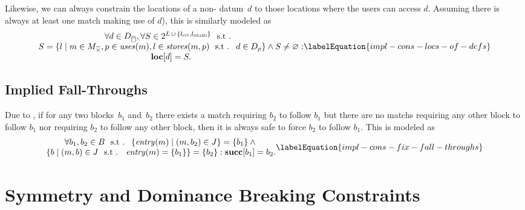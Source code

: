 Likewise, we can always constrain the \glspl{location} of a non- \gls{datum}~$d$ to those \glspl{location} where the users can access
$d$\hspace{-.8pt}.
%
Assuming there is always at least one \gls{match} making use of $d$), this is
similarly modeled as
%
\begin{equation}
  \begin{array}{@{}c@{}}
    \forall d \in \mStateDataCompSet,
    \forall S \in
      \mPowerset{\mLocationSet
      \, \cup \,
      \mSet{\mIntLocation, \mKilledLocation}} \text{ \st} \\
    S = \mSetBuilder{l}%
                    {%
                      m \in \mKillMatchCompSet,
                      p \in \mUses(m),
                      l \in \mStores(m, p)
                      \text{ \st }
                      d \in \mDataSet[p]
                    }
    \mAnd
    S \neq \mEmptySet : \\
    \mVar{loc}[d] = S.
  \end{array}
  \labelEquation{impl-cons-locs-of-defs}
\end{equation}


\subsection{Implied Fall-Throughs}

Due to , if for any two \glspl{block}~$b_1$ and~$b_2$
there exists a \gls{match} requiring $b_2$ to follow $b_1$ but there are no
\glspl{match} requiring any other \gls{block} to follow $b_1$ nor requiring
$b_2$ to follow any other \gls{block}, then it is always safe to force $b_2$ to
follow $b_1$.
%
This is modeled as
%
\begin{equation}
  \begin{array}{@{}c@{}}
    \forall b_1, b_2 \in \mBlockSet
    \text{ \st }
    \mSetBuilder{\mEntry(m)}{\mPair{m}{b_2} \in \mFallThroughSet} = \mSet{b_1}
    \mAnd \mbox{} \\
    \mSetBuilder{b}%
                {%
                  \mPair{m}{b} \in \mFallThroughSet
                  \text{ \st }
                  \mEntry(m) = \mSet{b_1}%
                } = \mSet{b_2} :
    \mVar{succ}[b_1] = b_2.
  \end{array}
  \labelEquation{impl-cons-fix-fall-throughs}
\end{equation}


\section{Symmetry and Dominance Breaking Constraints}

